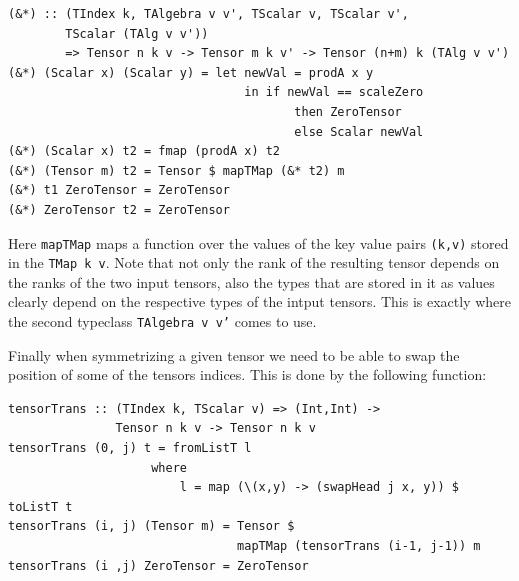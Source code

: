 \documentclass[a4paper,12pt, DIV=14, BCOR=5mm, twoside, headsepline]{scrbook}
\begin{document}
\begin{samepage} 
\begin{verbatim}
(&*) :: (TIndex k, TAlgebra v v', TScalar v, TScalar v',
        TScalar (TAlg v v'))
        => Tensor n k v -> Tensor m k v' -> Tensor (n+m) k (TAlg v v') 
(&*) (Scalar x) (Scalar y) = let newVal = prodA x y 
                                 in if newVal == scaleZero
                                        then ZeroTensor 
                                        else Scalar newVal 
(&*) (Scalar x) t2 = fmap (prodA x) t2 
(&*) (Tensor m) t2 = Tensor $ mapTMap (&* t2) m 
(&*) t1 ZeroTensor = ZeroTensor 
(&*) ZeroTensor t2 = ZeroTensor
\end{verbatim} 
\end{samepage}

Here \texttt{mapTMap} maps a function over the values of the key value pairs \texttt{(k,v)} stored in the \texttt{TMap k v}.
Note that not only the rank of the resulting tensor depends on the ranks of the two input tensors, also the types that are stored in it as values clearly depend on the respective types of the intput tensors. This is exactly where the second typeclass \texttt{TAlgebra v v'} comes to use. 

Finally when symmetrizing a given tensor we need to be able to swap the position of some of the tensors indices. This is done by the following function:

\begin{samepage} 
\begin{verbatim}
tensorTrans :: (TIndex k, TScalar v) => (Int,Int) ->
               Tensor n k v -> Tensor n k v
tensorTrans (0, j) t = fromListT l
                    where 
                        l = map (\(x,y) -> (swapHead j x, y)) $ toListT t
tensorTrans (i, j) (Tensor m) = Tensor $ 
                                mapTMap (tensorTrans (i-1, j-1)) m 
tensorTrans (i ,j) ZeroTensor = ZeroTensor
\end{verbatim} 
\end{samepage}
\end{document}
